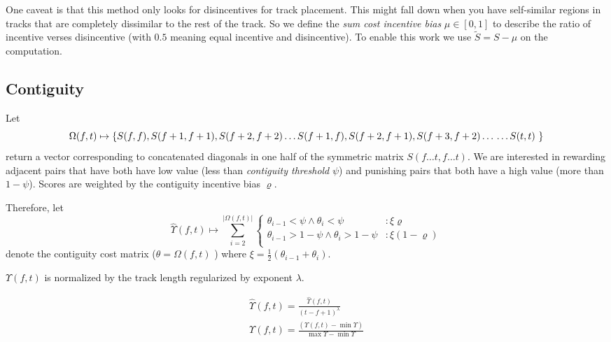 \documentclass[twocolumn]{article}
\begin{document}
One caveat is that this method only looks for disincentives for track placement. This might fall down when you have self-similar regions in tracks that are completely dissimilar to the rest of the track. So we define the \textit{sum cost incentive bias} $\mu \in \left[0,1\right]$ to describe the ratio of incentive verses disincentive (with $0.5$ meaning equal incentive and disincentive). To enable this work we use $\tilde S=S-\mu$ on the computation.

\subsection{Contiguity}

Let \begin{dmath*}
	\Omega( f,t ) \mapsto \left\{ \\
		S(f,f), S(f+1,f+1), S(f+2,f+2) \ldots \\
		S(f+1,f), S(f+2,f+1), S(f+3,f+2) \ldots \\
		\ldots \\
		S(t,t) 
		 ~ \right\}  
\end{dmath*} return a vector corresponding to concatenated diagonals in one half of the symmetric matrix $S( f \ldots t, f \ldots t )$. We are interested in rewarding adjacent pairs that have both have low value (less than \textit{contiguity threshold} $\psi$) and punishing pairs that both have a high value (more than $1-\psi$). Scores are weighted by the contiguity incentive bias $\varrho$.

Therefore, let
\begin{dmath*}\hat\Upsilon(f, t) \mapsto  \sum_{i=2}^{|\Omega( f,t )|}{ \left\{
\begin{array}{lr}
\theta_{i-1} < \psi \land \theta_i < \psi & :  \xi\varrho  \\
\theta_{i-1} > 1-\psi \land \theta_i > 1-\psi & : \xi(1-\varrho)  \\
\end{array}
\right.}
\end{dmath*} denote the contiguity cost matrix ($\theta=\Omega( f,t )$ ) where $\xi=\frac{1}{2}\left(\theta_{i-1}+\theta_{i}\right)$.

$\Upsilon(f, t)$ is normalized by the track length regularized by exponent $\lambda$.

\begin{multline*}
\hat\Upsilon(f, t) = \frac{\hat\Upsilon(f, t)}{(t-f+1)^\lambda} \\
\Upsilon(f, t) = \frac{ \left( \Upsilon(f, t) - \min \Upsilon \right) }{ \max \Upsilon -\min \Upsilon  }
\end{multline*} 
\end{document}

